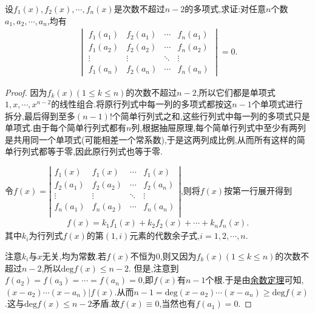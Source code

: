 \documentclass[../../main.tex]{subfiles}
\begin{document}
\begin{proposition}\label{proposition:元素都是多项式的行列式值为零}
设\(f_1(x), f_2(x), \cdots, f_n(x)\)是次数不超过\(n - 2\)的多项式,求证:对任意\(n\)个数\(a_1, a_2, \cdots, a_n\),均有
\begin{align*}
\begin{vmatrix}
f_1(a_1) & f_2(a_1) & \cdots & f_n(a_1) \\
f_1(a_2) & f_2(a_2) & \cdots & f_n(a_2) \\
\vdots & \vdots & \ddots & \vdots \\
f_1(a_n) & f_2(a_n) & \cdots & f_n(a_n)
\end{vmatrix} = 0.
\end{align*}
\end{proposition}
\begin{proof}
{\color{blue}}
因为\(f_k(x)(1 \leqslant  k \leqslant  n)\)的次数不超过\(n - 2\),所以它们都是单项式\(1,x,\cdots,x^{n - 2}\)的线性组合.将原行列式中每一列的多项式都按这\(n - 1\)个单项式进行拆分,最后得到至多$(n-1)!$个简单行列式之和,这些行列式中每一列的多项式只是单项式.由于每个简单行列式都有\(n\)列,根据抽屉原理,每个简单行列式中至少有两列是共用同一个单项式(可能相差一个常系数),于是这两列成比例,从而所有这样的简单行列式都等于零,因此原行列式也等于零.

{\color{blue}}
令$f\left( x \right) =\left| \begin{matrix}
f_1(x)&		f_1(x)&		\cdots&		f_1(x)\\
f_2(a_1)&		f_2(a_2)&		\cdots&		f_2(a_n)\\
\vdots&		\vdots&		\ddots&		\vdots\\
f_n(a_1)&		f_n(a_2)&		\cdots&		f_n(a_n)\\
\end{matrix} \right|$,则将$f(x)$按第一行展开得到
\begin{align*}
f\left( x \right) =k_1f_1\left( x \right) +k_2f_2\left( x \right) +\cdots +k_nf_n\left( x \right) .
\end{align*}
其中$k_i$为行列式$f\left( x \right)$的第$\left( 1,i \right)$元素的代数余子式,$i=1,2,\cdots ,n$.

注意$k_i$与$x$无关,均为常数.若$f(x)$不恒为0,则又因为\(f_k(x)(1 \leqslant  k \leqslant  n)\)的次数不超过\(n - 2\),所以$\mathrm{deg}f(x)\le n-2$.
但是,注意到$f(a_2)=f(a_3)=\cdots=f(a_n)=0$,即$f(x)$有$n-1$个根.于是由\hyperlink{余数定理}{余数定理}可知,$\left( x-a_2 \right) \cdots \left( x-a_n \right) |f\left( x \right)$.从而$n-1=\mathrm{deg}\left( x-a_2 \right) \cdots \left( x-a_n \right) \ge \mathrm{deg}f\left( x \right)$.这与$\mathrm{deg}f(x)\le n-2$矛盾.故$f(x)\equiv 0$,当然也有$f(a_1)=0$.


\end{proof}
\end{document}
